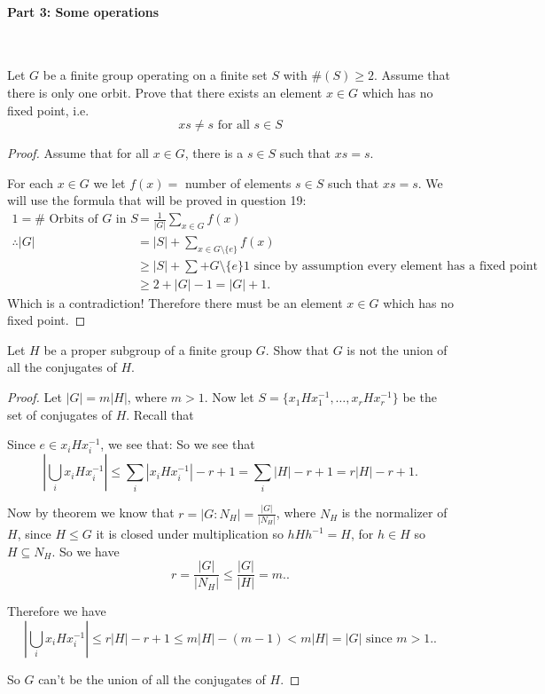 \paragraph*{Part 3: Some operations}

\

\begin{exercise}
    Let $G$ be a finite group operating on a finite set $S$ with $\#(S)\geq 2$. Assume that there is only one orbit. Prove that there exists an element $x\in G$ which has no fixed point, i.e. \[xs \neq s \text{ for all }s\in S\]

    \begin{proof}
    Assume that for all $x\in G$, there is a $s\in S$ such that $xs = s$.

    For each $x\in G$ we let $f(x) = $ number of elements $s\in S$ such that $xs = s$. We will use the formula that will be proved in question 19: \begin{align}
    1 = \text{# Orbits of }G\text{ in }S &= \frac{1}{|G|}\sum_{x\in G}f(x)\\
    \therefore |G| &= |S| + \sum_{x\in G\setminus\{e\}}f(x)\\
    &\geq |S| + \sum+{G\setminus\{e\}} 1 \text{ since by assumption every element has a fixed point}\\
    &\geq 2+|G|-1 = |G|+1
.\end{align}
Which is a contradiction! Therefore there must be an element $x\in G$ which has no fixed point.
    \end{proof}

\end{exercise}

\begin{exercise}
    Let $H$ be a proper subgroup of a finite group $G$. Show that $G$ is not the union of all the conjugates of $H$.
    \begin{proof}
    Let $|G| = m|H|$, where $m> 1$. Now let $S = \{x_1Hx_1^{-1},\ldots,x_r H x_r^{-1}\}$ be the set of conjugates of $H$. Recall that 

Since $e\in x_i H x_i^{-1}$, we see that:
So we see that  \[
    |\bigcup_i x_i H x_i^{-1}| \leq \sum_i |x_i H x_i^{-1}| - r +1 = \sum_i |H| - r + 1 = r|H| - r + 1
.\]

Now by theorem we know that $r = |G\colon N_H| = \frac{|G|}{|N_H|}$, where  $N_H$ is the normalizer of $H$, since $H\leq G$ it is closed under multiplication so $hHh^{-1} = H$, for  $h\in H$
so  $H\subseteq N_H$. So we have  \[
    r = \frac{|G|}{|N_H|}\leq \frac{|G|}{|H|} = m. 
.\]

Therefore we have \[
    |\bigcup_i x_i H x_i^{-1}| \leq r|H| - r + 1 \leq m|H| - (m-1) < m|H| = |G| \text{ since }m>1.
.\]

So $G$ can't be the union of all the conjugates of $H$.


\end{proof}
\end{exercise}


